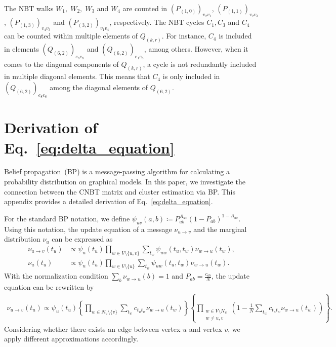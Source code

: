 \documentclass{article}
\theoremstyle{plain}
\begin{document}
The NBT walks $W_1,\; W_2,\; W_3$ and $W_4$ are counted in $( P_{(1,0)} )_{v_2 v_1}$, $( P_{(1,1)} )_{v_2 v_3}$, $( P_{(1,3)} )_{v_4 v_3}$ and $( P_{(3,2)} )_{v_1 v_4}$, respectively.
The NBT cycles $C_1, C_3$ and $C_4$ can be counted within multiple elements of $Q_{(k,r)}$.
For instance, $C_4$ is included in elements $( Q_{(6,2)} )_{e_8 e_8}$ and $( Q_{(6,2)} )_{e_1 e_8}$, among others.
However, when it comes to the diagonal components of $Q_{(k,r)}$, a cycle is not redundantly included in multiple diagonal elements.
This means that $C_4$ is only included in $( Q_{(6,2)} )_{e_8 e_8}$ among the diagonal elements of $Q_{(6,2)}$.

\section{Derivation of Eq.~\eqref{eq:delta_equation}}\label{appendix:derivation_delta}

Belief propagation~(BP) is a message-passing algorithm for calculating a probability distribution on graphical models.
In this paper, we investigate the connection between the CNBT matrix and cluster estimation via BP.
This appendix provides a detailed derivation of Eq.~\eqref{eq:delta_equation}.

For the standard BP notation, we define $\psi_{uv}(a,b) \coloneqq P_{a b}^{A_{uv}} (1-P_{a b})^{1-A_{uv}}$.
Using this notation, the update equation of a message $\nu_{u\to v}$ and the marginal distribution $\nu_{u}$ can be expressed as
\begin{align*}
	\nu_{u\to v}(t_u) & \propto \psi_u(t_u) \prod_{w\in V\setminus \{u, v\}} \sum_{t_w} \psi_{uw}(t_u, t_w) \nu_{w\to u}(t_w)
	,                                                                                                                         \\
	\nu_u(t_u)        & \propto \psi_u(t_u) \prod_{w\in V\setminus \{ u \}} \sum_{t_w} \psi_{uw}(t_u, t_w) \nu_{w\to u}(t_w)
	.
\end{align*}
With the normalization condition $\sum_{b} \nu_{w\to u}(b) = 1$ and $P_{ab} = \frac{c_{ab}}{N}$, the update equation can be rewritten by
\begin{align*}
	\nu_{u\to v}(t_u) \propto \psi_u(t_u) \left\{ \prod_{w\in N_u \setminus \{ v \}} \sum_{t_w} c_{t_u t_w} \nu_{w\to u}(t_w) \right\} \left\{ \prod_{\substack{w\in V\setminus N_u \\ w\neq u,v}} \left( 1-\frac{1}{N} \sum_{t_w} c_{t_u t_w} \nu_{w\to u}(t_w) \right) \right\}
	.
\end{align*}
Considering whether there exists an edge between vertex $u$ and vertex $v$, we apply different approximations accordingly.
\end{document}
